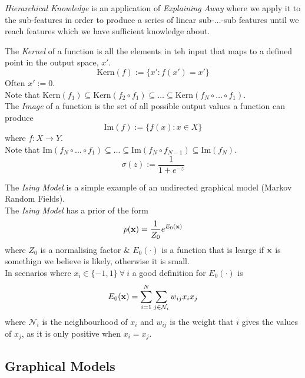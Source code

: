 \documentclass[11pt,a4paper]{article}
\begin{document}
\textit{Hierarchical Knowledge} is an application of \textit{Explaining Away} where we apply it to the sub-features in order to produce a series of linear sub-$\dots$-sub features until we reach features which we have sufficient knowledge about.


The \textit{Kernel} of a function is all the elements in teh input that maps to a defined point in the output space, $x'$.
$$\text{Kern}(f):=\{x':f(x')=x'\}$$
\nb Often $x':=0$.\\
Note that $\text{Kern}(f_1)\subseteq\text{Kern}(f_2\circ f_1)\subseteq\dots\subseteq\text{Kern}(f_N\circ\dots\circ f_1)$.\\

The \textit{Image} of a function is the set of all possible output values a function can produce
$$\text{Im}(f):=\{f(x):x\in X\}$$
where $f:X\to Y$.\\
Note that $\text{Im}(f_N\circ\dots\circ f_1)\subseteq\dots\subseteq\text{Im}(f_N\circ f_{N-1})\subseteq\text{Im}(f_N)$.\\

$$\sigma(z):=\frac{1}{1+e^{-z}}$$

The \textit{Ising Model} is a simple example of an undirected graphical model (Markov Random Fields).\\
The \textit{Ising Model} has a prior of the form
$$p(\textbf{x})=\frac{1}{Z_0}e^{E_0(\textbf{x})}$$
where $Z_0$ is a normalising factor \& $E_0(\cdot)$ is a function that is learge if $\textbf{x}$ is somethign we believe is likely, otherwise it is small.\\
In scenarios where $x_i\in\{-1,1\}\ \forall\ i$ a good definition for $E_0(\cdot)$ is
$$E_0(\textbf{x})=\sum_{i=1}^N\sum_{j\in\mathcal{N}_i}w_{ij}x_ix_j$$
where $\mathcal{N}_i$ is the neighbourhood of $x_i$ and $w_{ij}$ is the weight that $i$ gives the values of $x_j$, as it is only positive when $x_i=x_j$.\\

\subsection{Graphical Models}
\end{document}
